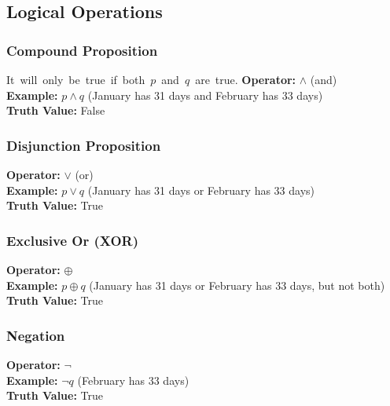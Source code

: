 \documentclass{article}
\begin{document}
\subsection{Logical Operations}
\subsubsection{Compound Proposition}
\hbox{It will only be true if both $p$ and $q$ are true.}
\textbf{Operator:} $\land$ (and)  \\
\textbf{Example:} $p \land q$ (January has 31 days and February has 33 days)  \\
\textbf{Truth Value:} False

\subsubsection{Disjunction Proposition}
\textbf{Operator:} $\lor$ (or)  \\
\textbf{Example:} $p \lor q$ (January has 31 days or February has 33 days)  \\
\textbf{Truth Value:} True

\subsubsection{Exclusive Or (XOR)}
\textbf{Operator:} $\oplus$  \\
\textbf{Example:} $p \oplus q$ (January has 31 days or February has 33 days, but not both)  \\
\textbf{Truth Value:} True

\subsubsection{Negation}
\textbf{Operator:} $\neg$  \\
\textbf{Example:} $\neg q$ (February has 33 days)  \\
\textbf{Truth Value:} True
\end{document}
